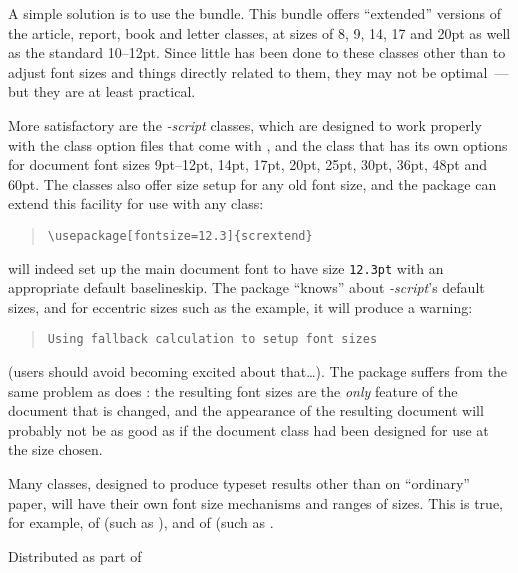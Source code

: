 A simple solution is to use the  bundle.  This
bundle offers ``extended'' versions of the article, report, book and
letter classes, at sizes of 8, 9, 14, 17 and 20pt as well as the
standard 10--12pt.  Since little has been done to these classes other
than to adjust font sizes and things directly related to them, they
may not be optimal~--- but they are at least practical.

More satisfactory are the \emph{-script} classes, which are
designed to work properly with the class option files that come with
, and the  class that has its own
options for document font sizes 9pt--12pt, 14pt, 17pt, 20pt, 25pt,
30pt, 36pt, 48pt and 60pt.  The classes also offer size setup for any
old font size, and the  package can extend this
facility for use with any class:
\begin{quote}
\begin{verbatim}
\usepackage[fontsize=12.3]{scrextend}
\end{verbatim}
\end{quote}
will indeed set up the main document font to have size \texttt{12.3pt}
with an appropriate default baselineskip.  The package ``knows'' about
\emph{-script}'s default sizes, and for eccentric sizes
such as the example, it will produce a warning:
\begin{quote}
\begin{verbatim}
Using fallback calculation to setup font sizes
\end{verbatim}
\end{quote}
(users should avoid becoming excited about that\dots{}).  The package
suffers from the same problem as does : the
resulting font sizes are the \emph{only} feature of the document that
is changed, and the appearance of the resulting document will probably
not be as good as if the document class had been designed for use at
the size chosen.

Many classes, designed to produce typeset results other than on
``ordinary'' paper, will have their own font size mechanisms and
ranges of sizes.  This is true, for example, of %
 (such as ), and of
 (such as
.
\begin{ctanrefs}
\item[a0poster.cls]
\item[beamer.cls]
\item[extsizes bundle]
\item[\nothtml{\rmfamily}KOMA script bundle]
\item[memoir.cls]
\item[scrextend.sty]Distributed as part of 
\end{ctanrefs}


